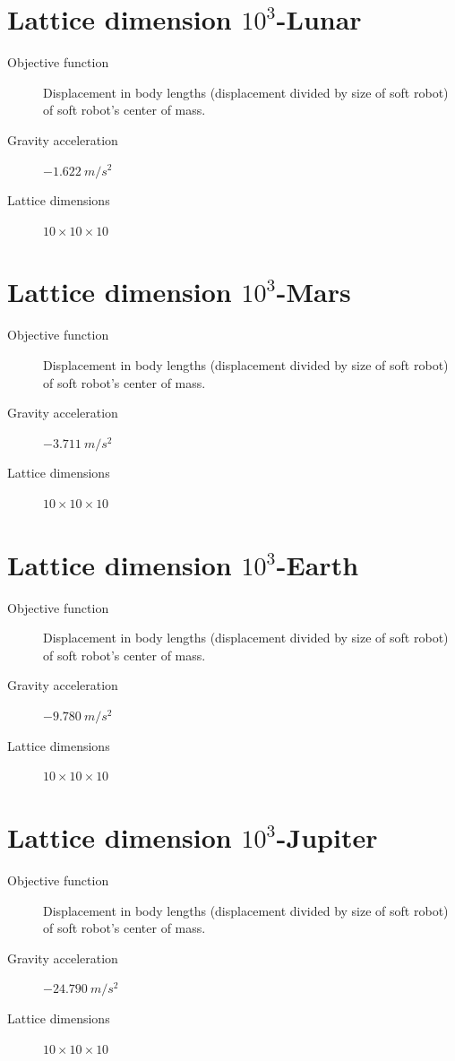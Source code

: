 \section{Lattice dimension $10^3$-Lunar}
\label{Settings-size10-moon}
\begin{small}
\begin{description}
\item[Objective function]{Displacement in body lengths (displacement divided by size of soft robot) of soft robot's center of mass.}
\item[Gravity acceleration]{$-1.622\ m/s^2$}
\item[Lattice dimensions]{$10 \times 10 \times 10$}
\end{description}
\end{small}

\section{Lattice dimension $10^3$-Mars}
\label{Settings-size10-mars}
\begin{small}
\begin{description}
\item[Objective function]{Displacement in body lengths (displacement divided by size of soft robot) of soft robot's center of mass.}
\item[Gravity acceleration]{$-3.711\ m/s^2$}
\item[Lattice dimensions]{$10 \times 10 \times 10$}
\end{description}
\end{small}

\section{Lattice dimension $10^3$-Earth}
\label{Settings-size10-earth}
\begin{small}
\begin{description}
\item[Objective function]{Displacement in body lengths (displacement divided by size of soft robot) of soft robot's center of mass.}
\item[Gravity acceleration]{$-9.780\ m/s^2$}
\item[Lattice dimensions]{$10 \times 10 \times 10$}
\end{description}
\end{small}

\section{Lattice dimension $10^3$-Jupiter}
\label{Settings-size10-jupiter}
\begin{small}
\begin{description}
\item[Objective function]{Displacement in body lengths (displacement divided by size of soft robot) of soft robot's center of mass.}
\item[Gravity acceleration]{$-24.790\ m/s^2$}
\item[Lattice dimensions]{$10 \times 10 \times 10$}
\end{description}
\end{small}

